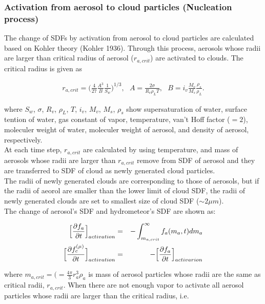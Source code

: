 \subsubsection{Activation from aerosol to cloud particles (Nucleation process)}
The change of SDFs by activation from aerosol to cloud particles are calculated based on Kohler theory (Kohler 1936). Through this process, aerosols whose radii are larger than critical radius of aerosol ($r_{a,crit}$) are activated to clouds. The critical radius is given as

\begin{eqnarray}
r_{a,crit}=\bigl( \frac{4}{27}\frac{A^{3}}{B}\frac{1}{S_{w}}\Bigr )^{1/3}, \:\:\:A=\frac{2\sigma}{R_{v}\rho_{L}T},\:\:\: B=i_{v}\frac{M_{v}}{M_{s}}\frac{\rho_{s}}{\rho_{L}}.\label{s10-3}
\end{eqnarray}

where $S_{w}$, $\sigma$, $R_{v}$, $\rho_{L}$, $T$, $i_{v}$, $M_{v}$, $M_{s}$, $\rho_{s}$ show supersaturation of water, surface tention of water, gas constant of vapor, temperature, van't Hoff factor ($=2$), moleculer weight of water, moleculer weight of aerosol, and density of aerosol, respectively.\\
At each time step, $r_{a,crit}$ are calculated by using temperature, and mass of aerosols whose radii are larger than $r_{a,crit}$ remove from SDF of aerosol and they are transferred to SDF of cloud as newly generated cloud particles.\\
The radii of newly generated clouds are corresponding to those of aerosols, but if the radii of aeorol are smaller than the lower limit of cloud SDF, the radii of newly generated clouds are set to smallest size of cloud SDF ($\sim 2 \mu m$).\\
The change of aerosol's SDF and hydrometeor's SDF are shown as:

\begin{eqnarray}
\Bigl[\frac{\partial f_{a}}{\partial t}\Bigr]_{activation}&=&-\int_{m_{a,crit}}^{\infty}f_{a}(m_{a},t)dm_{a}\label{s10-4}\\
\Bigl[\frac{\partial f_{c}^{(\mu)}}{\partial t}\Bigr]_{activation}&=&-\Bigl[\frac{\partial f_{a}}{\partial t}\Bigr]_{activarion}\label{s10-5}
\end{eqnarray}

where $m_{a,crit}=\bigl(=\frac{4\pi}{3}r_{a}^{3}\rho_{a}$ is mass of aerosol particles whose radii are the same as critical radii, $r_{a,crit}$. When there are not enough vapor to activate all aerosol particles whose radii are larger than the critical radius, i.e.

